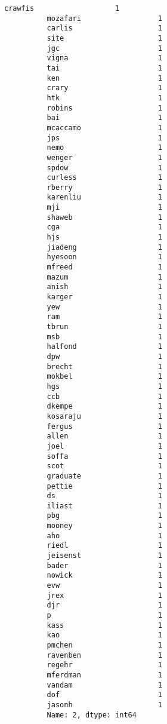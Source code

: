 \documentclass[11pt]{article}
\begin{document}
\begin{Verbatim}[commandchars=\\\{\}]
          crawfis                   1
          mozafari                  1
          carlis                    1
          site                      1
          jgc                       1
          vigna                     1
          tai                       1
          ken                       1
          crary                     1
          htk                       1
          robins                    1
          bai                       1
          mcaccamo                  1
          jps                       1
          nemo                      1
          wenger                    1
          spdow                     1
          curless                   1
          rberry                    1
          karenliu                  1
          mji                       1
          shaweb                    1
          cga                       1
          hjs                       1
          jiadeng                   1
          hyesoon                   1
          mfreed                    1
          mazum                     1
          anish                     1
          karger                    1
          yew                       1
          ram                       1
          tbrun                     1
          msb                       1
          halfond                   1
          dpw                       1
          brecht                    1
          mokbel                    1
          hgs                       1
          ccb                       1
          dkempe                    1
          kosaraju                  1
          fergus                    1
          allen                     1
          joel                      1
          soffa                     1
          scot                      1
          graduate                  1
          pettie                    1
          ds                        1
          iliast                    1
          pbg                       1
          mooney                    1
          aho                       1
          riedl                     1
          jeisenst                  1
          bader                     1
          nowick                    1
          evw                       1
          jrex                      1
          djr                       1
          p                         1
          kass                      1
          kao                       1
          pmchen                    1
          ravenben                  1
          regehr                    1
          mferdman                  1
          vandam                    1
          dof                       1
          jasonh                    1
          Name: 2, dtype: int64
\end{Verbatim}
        
\end{document}
